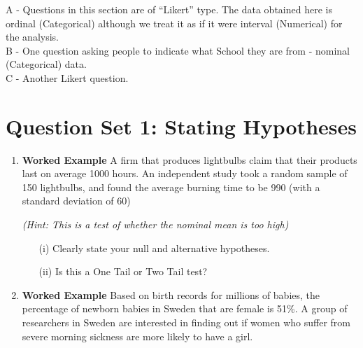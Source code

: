 \documentclass[]{report}
\begin{document}
A - Questions in this section are of ``Likert'' type. The data obtained here is ordinal (Categorical) although we treat it as if it were interval (Numerical) for the analysis.\\
\vspace{0.2cm}
B - One question asking people to indicate what School they are from - nominal (Categorical) data.\\
\vspace{0.2cm}
C - Another Likert question.




\newpage	
\section*{Question Set 1: Stating Hypotheses}


\begin{enumerate}	
	\item \textbf{Worked Example}
	A firm that produces lightbulbs claim that their products last on average 1000 hours. An independent study took a random sample of 150 lightbulbs, and found the average burning time to be 990 (with a standard deviation of 60)
	
	\textit{(Hint: This is a test of whether the nominal mean is too high)}
	
	\begin{itemize}
		\item[(i)] Clearly state your null and alternative hypotheses.
		\item[(ii)] Is this a One Tail or Two Tail test?
	\end{itemize}
	\item \textbf{Worked Example}
	Based on birth records for millions of babies, the percentage of newborn babies in Sweden that are female is 51\%. A group of researchers in Sweden are interested in finding out if women who suffer from severe morning
	sickness are more likely to have a girl. 
	

\end{enumerate}
\end{document}
